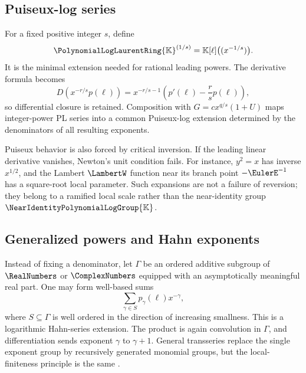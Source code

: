 \documentclass[11pt,oneside]{article}
\numberwithin{equation}{section}
\theoremstyle{definition}
\newcommand{\K}{\mathbb{K}}
\newcommand{\PL}{\PolynomialLogLaurentRing{\K}}
\newcommand{\Gnear}{\NearIdentityPolynomialLogGroup{\K}}
\begin{document}
\subsection{Puiseux-log series}

For a fixed positive integer \(s\), define
\begin{equation}\label{eq:Puiseux-log}
  \PL^{(1/s)}=\K[\ell]\bigl((x^{-1/s})\bigr).
\end{equation}
It is the minimal extension needed for rational leading powers.  The derivative
formula becomes
\begin{equation}\label{eq:Puiseux-derivative}
  D\left(x^{-r/s}p(\ell)\right)
  =x^{-r/s-1}\left(p'(\ell)-\frac{r}{s}p(\ell)\right),
\end{equation}
so differential closure is retained.  Composition with
\(G=cx^{q/s}(1+U)\) maps integer-power PL series into a common Puiseux-log
extension determined by the denominators of all resulting exponents.

Puiseux behavior is also forced by critical inversion.  If the leading
linear derivative vanishes, Newton's unit condition fails.  For instance,
\(y^2=x\) has inverse \(x^{1/2}\), and the Lambert \(\LambertW\) function near its branch
point \(-\EulerE^{-1}\) has a square-root local parameter.  Such expansions are not a
failure of reversion; they belong to a ramified local scale rather than the
near-identity group \(\Gnear\).

\subsection{Generalized powers and Hahn exponents}

Instead of fixing a denominator, let \(\Gamma\) be an ordered additive subgroup
of \(\RealNumbers\) or \(\ComplexNumbers\) equipped with an asymptotically meaningful real part.  One
may form well-based sums
\begin{equation}\label{eq:generalized-power-log}
  \sum_{\gamma\in S}p_\gamma(\ell)x^{-\gamma},
\end{equation}
where \(S\subseteq\Gamma\) is well ordered in the direction of increasing
smallness.  This is a logarithmic Hahn-series extension.  The product is again
convolution in \(\Gamma\), and differentiation sends exponent \(\gamma\) to
\(\gamma+1\).  General transseries replace the single exponent group by
recursively generated monomial groups, but the local-finiteness principle is the
same \cite{EdgarBeginners,VanDerHoeven2006}.
\end{document}
